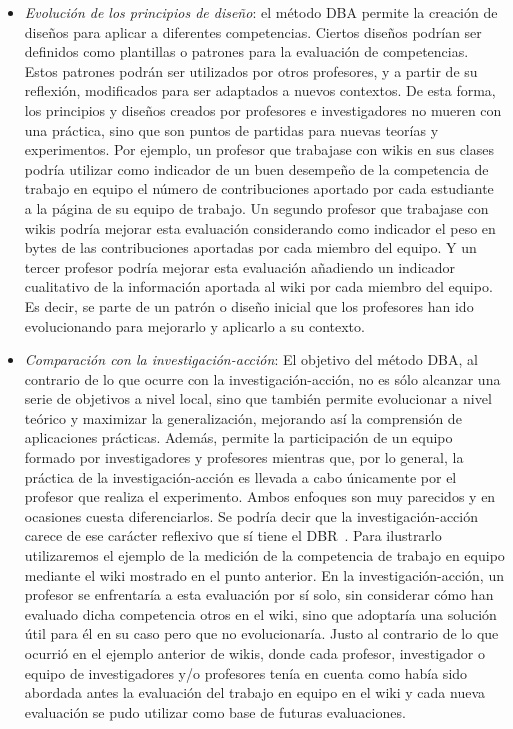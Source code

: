 \begin{itemize}
\item \emph{Evolución de los principios de diseño}: el método DBA permite la creación de diseños para aplicar a diferentes competencias. Ciertos diseños podrían ser definidos como plantillas o patrones para la evaluación de competencias. Estos patrones podrán ser utilizados por otros profesores, y a partir de su reflexión, modificados para ser adaptados a nuevos contextos. De esta forma, los principios y diseños creados por profesores e investigadores no mueren con una práctica, sino que son puntos de partidas para nuevas teorías y experimentos. Por ejemplo, un profesor que trabajase con wikis en sus clases podría utilizar como indicador de un buen desempeño de la competencia de trabajo en equipo el número de contribuciones aportado por cada estudiante a la página de su equipo de trabajo. Un segundo profesor que trabajase con wikis podría mejorar esta evaluación considerando como indicador el peso en bytes de las contribuciones aportadas por cada miembro del equipo. Y un tercer profesor podría mejorar esta evaluación añadiendo un indicador cualitativo de la información aportada al wiki por cada miembro del equipo. Es decir, se parte de un patrón o diseño inicial que los profesores han ido evolucionando para mejorarlo y aplicarlo a su contexto.
\item \emph{Comparación con la investigación-acción}: El objetivo del método DBA, al contrario de lo que ocurre con la investigación-acción, no es sólo alcanzar una serie de objetivos a nivel local, sino que también permite evolucionar a nivel teórico y maximizar la generalización, mejorando así la comprensión de aplicaciones prácticas. Además, permite la participación de un equipo formado por investigadores y profesores mientras que, por lo general, la práctica de la investigación-acción es llevada a cabo únicamente por el profesor que realiza el experimento. Ambos enfoques son muy parecidos y en ocasiones cuesta diferenciarlos. Se podría decir que la investigación-acción carece de ese carácter reflexivo que sí tiene el DBR~\cite{cole2005being}. Para ilustrarlo utilizaremos el ejemplo de la medición de la competencia de trabajo en equipo mediante el wiki mostrado en el punto anterior. En la investigación-acción, un profesor se enfrentaría a esta evaluación por sí solo, sin considerar cómo han evaluado dicha competencia otros en el wiki, sino que adoptaría una solución útil para él en su caso pero que no evolucionaría. Justo al contrario de lo que ocurrió en el ejemplo anterior de wikis, donde cada profesor, investigador o equipo de investigadores y/o profesores tenía en cuenta como había sido abordada antes la evaluación del trabajo en equipo en el wiki y cada nueva evaluación se pudo utilizar como base de futuras evaluaciones.

\end{itemize}
